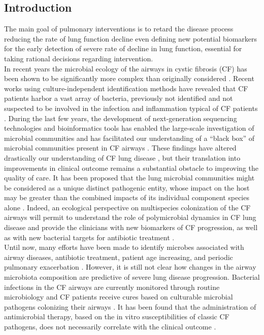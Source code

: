 \subsection{Introduction}
The main goal of pulmonary interventions is to retard the disease process reducing the rate of lung function decline even defining new potential biomarkers for the early detection of severe rate of decline in lung function, essential for taking rational decisions regarding intervention.\\
In recent years the microbial ecology of the airways in cystic fibrosis (CF) has been shown to be significantly more complex than originally considered \cite{lipuma2010changing, rogers2014respiratory}. Recent works using culture-independent identification methods have revealed that CF patients harbor a vast array of bacteria, previously not identified and not suspected to be involved in the infection and inflammation typical of CF patients \cite{zhao2012decade}. During the last few years, the development of next-generation sequencing technologies and bioinformatics tools has enabled the large-scale investigation of microbial communities and has facilitated our understanding of a ``black box'' of microbial communities present in CF airways \cite{delmont2011metagenomic}. These findings have altered drastically our understanding of CF lung disease \cite{rogers2014respiratory}, but their translation into improvements in clinical outcome remains a substantial obstacle to improving the quality of care. It has been proposed that the lung microbial communities might be considered as a unique distinct pathogenic entity, whose impact on the host may be greater than the combined impacts of its individual component species alone \cite{rogers2010comparing}. Indeed, an ecological perspective on multispecies colonization of the CF airways will permit to understand the role of polymicrobial dynamics in CF lung disease and provide the clinicians with new biomarkers of CF progression, as well as with new bacterial targets for antibiotic treatment \cite{sibley2008polymicrobial}.\\
Until now, many efforts have been made to identify microbes associated with airway diseases, antibiotic treatment, patient age increasing, and periodic pulmonary exacerbation \cite{zhao2012decade, cox2010airway, carmody2013changes, zhao2014modeling, zemanick2013inflammation}. However, it is still not clear how changes in the airway microbiota composition are predictive of severe lung disease progression. Bacterial infections in the CF airways are currently monitored through routine microbiology and CF patients receive cures based on culturable microbial pathogens colonizing their airways \cite{flume2009cystic}. It has been found that the administration of antimicrobial therapy, based on the in vitro susceptibilities of classic CF pathogens, does not necessarily correlate with the clinical outcome \cite{sibley2009relevance}.\\
